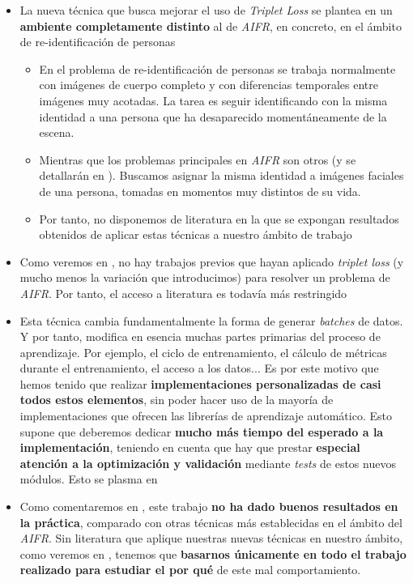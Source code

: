 \begin{itemize}
    \item La nueva técnica que busca mejorar el uso de \textit{Triplet Loss} se plantea en un \textbf{ambiente completamente distinto} al de \textit{AIFR}, en concreto, en el ámbito de re-identificación de personas \cite{informatica:principal}
        \begin{itemize}
            \item En el problema de re-identificación de personas se trabaja normalmente con imágenes de cuerpo completo y con diferencias temporales entre imágenes muy acotadas. La tarea es seguir identificando con la misma identidad a una persona que ha desaparecido momentáneamente de la escena.
            \item Mientras que los problemas principales en \textit{AIFR} son otros (y se detallarán en ). Buscamos asignar la misma identidad a imágenes faciales de una persona, tomadas en momentos muy distintos de su vida.
            \item Por tanto, no disponemos de literatura en la que se expongan resultados obtenidos de aplicar estas técnicas a nuestro ámbito de trabajo
        \end{itemize}
    \item Como veremos en , no hay trabajos previos que hayan aplicado \textit{triplet loss} (y mucho menos la variación que introducimos) para resolver un problema de \textit{AIFR}. Por tanto, el acceso a literatura es todavía más restringido
    \item Esta técnica cambia fundamentalmente la forma de generar \textit{batches} de datos. Y por tanto, modifica en esencia muchas partes primarias del proceso de aprendizaje. Por ejemplo, el ciclo de entrenamiento, el cálculo de métricas durante el entrenamiento, el acceso a los datos... Es por este motivo que hemos tenido que realizar \textbf{implementaciones personalizadas de casi todos estos elementos}, sin poder hacer uso de la mayoría de implementaciones que ofrecen las librerías de aprendizaje automático. Esto supone que deberemos dedicar \textbf{mucho más tiempo del esperado a la implementación}, teniendo en cuenta que hay que prestar \textbf{especial atención a la optimización y validación} mediante \textit{tests} de estos nuevos módulos. Esto se plasma en 
    \item Como comentaremos en , este trabajo \textbf{no ha dado buenos resultados en la práctica}, comparado con otras técnicas más establecidas en el ámbito del \textit{AIFR}. Sin literatura que aplique nuestras nuevas técnicas en nuestro ámbito, como veremos en , tenemos que \textbf{basarnos únicamente en todo el trabajo realizado para estudiar el por qué} de este mal comportamiento.
\end{itemize}

